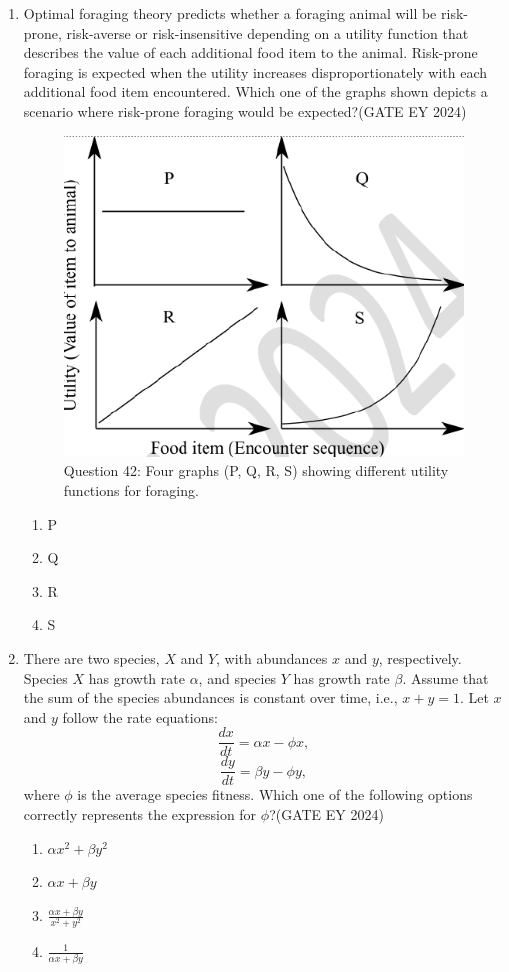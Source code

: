 \begin{enumerate}
\item Optimal foraging theory predicts whether a foraging animal will be risk-prone, risk-averse or risk-insensitive depending on a utility function that describes the value of each additional food item to the animal. Risk-prone foraging is expected when the utility increases disproportionately with each additional food item encountered. Which one of the graphs shown depicts a scenario where risk-prone foraging would be expected?\hfill{(GATE EY 2024)}
\begin{figure}[H]
    \centering
    \includegraphics[width=0.3\columnwidth]{figs/Q-42.png}
    \caption{Question 42: Four graphs (P, Q, R, S) showing different utility functions for foraging.}
    \label{Q.42}
\end{figure}
    \begin{multicols}{4}
    \begin{enumerate}
        \item P
        \item Q
        \item R
        \item S
    \end{enumerate}
    \end{multicols}

\item There are two species, $X$ and $Y$, with abundances $x$ and $y$, respectively. Species $X$ has growth rate $\alpha$, and species $Y$ has growth rate $\beta$. Assume that the sum of the species abundances is constant over time, i.e., $x + y = 1$. Let $x$ and $y$ follow the rate equations:
$$ \frac{dx}{dt} = \alpha x - \phi x, $$
$$ \frac{dy}{dt} = \beta y - \phi y, $$
where $\phi$ is the average species fitness. Which one of the following options correctly represents the expression for $\phi$?\hfill{(GATE EY 2024)}
    \begin{multicols}{2}
    \begin{enumerate}
        \item $\alpha x^2 + \beta y^2$
        \item $\alpha x + \beta y$
        \item $\frac{\alpha x + \beta y}{x^2 + y^2}$
        \item $\frac{1}{\alpha x + \beta y}$
    \end{enumerate}
    \end{multicols}


\end{enumerate}
